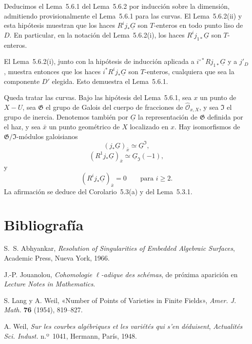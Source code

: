 Deducimos el Lema~5.6.1 del Lema~5.6.2 por inducción sobre la dimensión,
admitiendo provisionalmente el Lema~5.6.1 para las curvas. El
Lema~5.6.2(ii) y esta hipótesis muestran que los haces
$R^ij_*\underline G$ son $T$-enteros en todo punto liso de $D$. En
particular, en la notación del Lema~5.6.2(i), los haces
$R^ij_{1*}\underline G$ son $T$-enteros.

\pageoriginale

El Lema~5.6.2(i), junto con la hipótesis de inducción aplicada a
$i^{\circ *}Rj_{1*}\underline G$ y a $j'_D$, muestra entonces que los
haces $i^*R^ij_*\underline G$ son $T$-enteros, cualquiera que sea la
componente $D'$ elegida. Esto demuestra el Lema~5.6.1.

Queda tratar las curvas. Bajo las hipótesis del Lema~5.6.1, sea $x$ un
punto de $X-U$, sea $\mathfrak G$ el grupo de Galois del cuerpo de
fracciones de $\widehat{\mathcal O}_{x,X}$, y sea $\mathfrak I$ el grupo
de inercia. Denotemos también por $\underline G$ la representación de
$\mathfrak G$ definida por el haz, y sea $\bar x$ un punto geométrico de
$X$ localizado en $x$. Hay isomorfismos de
$\mathfrak G/\mathfrak I$-módulos galoisianos
\[
(j_*\underline G)_{\bar x}\simeq\underline G^{\mathfrak I},
\]
\[
(R^1j_*\underline G)_{\bar x}\simeq\underline G_{\mathfrak I}(-1),
\]
y
\[
(R^ij_*\underline G)_{\bar x}=0\qquad\text{para }i\geq2.
\]
La afirmación se deduce del Corolario~5.3(a) y del Lema~5.3.1.

\pageoriginale

\section*{Bibliografía}
\begin{enumerate}[label={\textup{[\arabic*]}},leftmargin=2.4em]
\item S.~S. Abhyankar, \emph{Resolution of Singularities of Embedded
  Algebraic Surfaces}, Academic Press, Nueva York, 1966.
\item J.-P. Jouanolou, \emph{Cohomologie $\ell$-adique des schémas}, de
  próxima aparición en \emph{Lecture Notes in Mathematics}.
\item S. Lang y A. Weil, «Number of Points of Varieties in Finite
  Fields», \emph{Amer. J. Math.} \textbf{76} (1954), 819--827.
\item A. Weil, \emph{Sur les courbes algébriques et les variétés qui
  s'en déduisent}, \emph{Actualités Sci. Indust.} n.º~1041, Hermann,
  París, 1948.
\end{enumerate}
